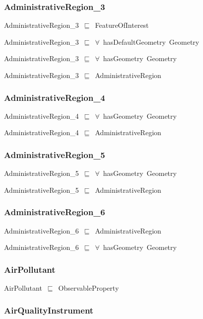 \documentclass{article}
\begin{document}
\subsubsection*{AdministrativeRegion\_3}

AdministrativeRegion\_3~\ensuremath{\sqsubseteq}~FeatureOfInterest~

AdministrativeRegion\_3~\ensuremath{\sqsubseteq}~\ensuremath{\forall}~hasDefaultGeometry~Geometry~

AdministrativeRegion\_3~\ensuremath{\sqsubseteq}~\ensuremath{\forall}~hasGeometry~Geometry~

AdministrativeRegion\_3~\ensuremath{\sqsubseteq}~AdministrativeRegion~

\subsubsection*{AdministrativeRegion\_4}

AdministrativeRegion\_4~\ensuremath{\sqsubseteq}~\ensuremath{\forall}~hasGeometry~Geometry~

AdministrativeRegion\_4~\ensuremath{\sqsubseteq}~AdministrativeRegion~

\subsubsection*{AdministrativeRegion\_5}

AdministrativeRegion\_5~\ensuremath{\sqsubseteq}~\ensuremath{\forall}~hasGeometry~Geometry~

AdministrativeRegion\_5~\ensuremath{\sqsubseteq}~AdministrativeRegion~

\subsubsection*{AdministrativeRegion\_6}

AdministrativeRegion\_6~\ensuremath{\sqsubseteq}~AdministrativeRegion~

AdministrativeRegion\_6~\ensuremath{\sqsubseteq}~\ensuremath{\forall}~hasGeometry~Geometry~

\subsubsection*{AirPollutant}

AirPollutant~\ensuremath{\sqsubseteq}~ObservableProperty~

\subsubsection*{AirQualityInstrument}
\end{document}
